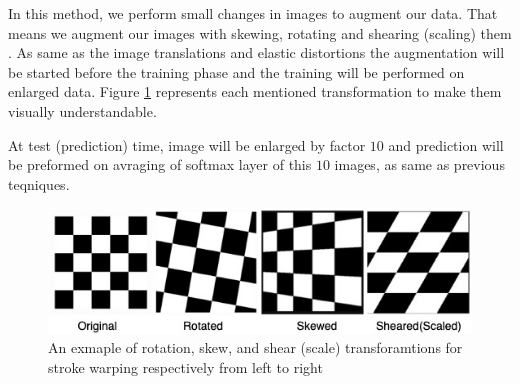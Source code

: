 In this method, we perform small changes in images to augment our data.  That means we augment our
images with skewing, rotating and shearing (scaling) them \cite{storke_warping_1997_source}. As same as the
image translations and elastic distortions the augmentation will be started before the
training phase and the training will be performed on enlarged data. Figure
\ref{fig:stroke_warping_transforamtions} represents each mentioned transformation to make them visually
understandable.

At test (prediction) time, image will be enlarged by factor $10$ and prediction will be preformed on
avraging of softmax layer of this $10$ images, as same as previous teqniques.

\begin{figure}
  \centering
  \label{fig:stroke_warping_transforamtions}
  \includegraphics[width=1\textwidth]{fig/stroke_warping_transforamtions}
  \caption{An exmaple of rotation, skew, and shear (scale) transforamtions for stroke warping respectively from left to right \cite{stroke_warping_github_picture}}
\end{figure}



